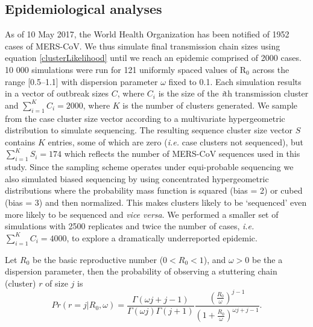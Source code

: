 \documentclass[11pt,oneside,letterpaper]{article}
\begin{document}
\subsection*{Epidemiological analyses}

As of 10 May 2017, the World Health Organization has been notified of 1952 cases of MERS-CoV.
We thus simulate final transmission chain sizes using equation \ref{clusterLikelihood} \citep{lloyd-smith_superspreading_2005,blumberg_inference_2013} until we reach an epidemic comprised of 2000 cases.
10 000 simulations were run for 121 uniformly spaced values of R$_{0}$ across the range [0.5--1.1] with dispersion parameter $\omega$ fixed to 0.1.
Each simulation results in a vector of outbreak sizes $C$, where $C_{i}$ is the size of the \textit{i}th transmission cluster and $\sum_{i=1}^{K} C_{i} = 2000$, where $K$ is the number of clusters generated.
We sample from the case cluster size vector according to a multivariate hypergeometric distribution to simulate sequencing.
The resulting sequence cluster size vector $S$ contains $K$ entries, some of which are zero (\textit{i.e.} case clusters not sequenced), but $\sum_{i=1}^{K} S_{i} = 174$ which reflects the number of MERS-CoV sequences used in this study.
Since the sampling scheme operates under equi-probable sequencing we also simulated biased sequencing by using concentrated hypergeometric distributions where the probability mass function is squared (bias = 2) or cubed (bias = 3) and then normalized.
This makes clusters likely to be `sequenced' even more likely to be sequenced and \textit{vice versa}.
We performed a smaller set of simulations with 2500 replicates and twice the number of cases, \textit{i.e.} $\sum_{i=1}^{K} C_{i} = 4000$, to explore a dramatically underreported epidemic.

Let $R_{0}$ be the basic reproductive number ($ 0 < R_{0} < 1$),  and $\omega > 0$ be the a dispersion parameter, then the probability of observing a stuttering chain (cluster) $r$ of size $j$ is~\citep{blumberg_inference_2013}
\begin{equation}
Pr(r = j | R_{0}, \omega) = \frac{\Gamma(\omega j+j-1)}{\Gamma(\omega j)\Gamma(j+1)} \frac{(\frac{R_{0}}{\omega})^{j-1}}{(1+\frac{R_{0}}{\omega})^{\omega j+j-1}}.
\label{clusterLikelihood}
\end{equation}
\end{document}

